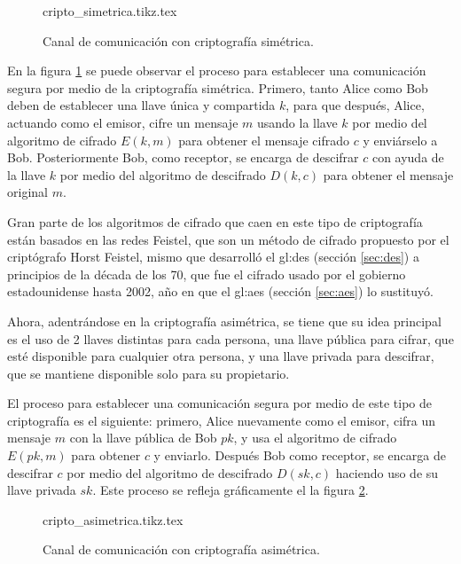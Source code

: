 \begin{figure}
  \begin{center}
    {cripto_simetrica.tikz.tex}
    \caption{Canal de comunicación con criptografía simétrica.}
    \label{cripto_simetrica}
  \end{center}
\end{figure}

En la figura \ref{cripto_simetrica} se puede observar el proceso para
establecer una comunicación segura por medio de la criptografía simétrica.
Primero, tanto Alice como Bob deben de establecer una llave única y
compartida $k$, para que después, Alice, actuando como el emisor, cifre un
mensaje $m$ usando la llave $k$ por medio del algoritmo de cifrado $E(k,m)$
para obtener el mensaje cifrado $c$ y enviárselo a Bob. Posteriormente
Bob, como receptor, se encarga de descifrar $c$ con ayuda de la llave $k$
por medio del algoritmo de descifrado $D(k,c)$ para obtener el mensaje original
$m$.

Gran parte de los algoritmos de cifrado que caen en este tipo de criptografía
están basados en las redes Feistel, que son un método de cifrado propuesto
por el criptógrafo Horst Feistel, mismo que desarrolló el \gls{gl:des}
(sección \ref{sec:des}) a principios de la década de los 70, que fue el
cifrado usado por el gobierno estadounidense hasta 2002, año en que el
\gls{gl:aes} (sección \ref{sec:aes}) lo sustituyó.

Ahora, adentrándose en la criptografía asimétrica, se tiene que su idea
principal es el uso de 2 llaves distintas para cada persona, una llave
pública para cifrar, que esté disponible para cualquier otra persona, y una
llave privada para descifrar, que se mantiene disponible solo para su
propietario.

El proceso para establecer una comunicación segura por medio de este tipo
de criptografía es el siguiente: primero, Alice nuevamente como el emisor,
cifra un mensaje $m$ con la llave pública de Bob $pk$, y usa el algoritmo de
cifrado $E(pk,m)$ para obtener $c$ y enviarlo. Después Bob como receptor,
se encarga de descifrar $c$ por medio del algoritmo de descifrado
$D(sk,c)$ haciendo uso de su llave privada $sk$. Este proceso se refleja
gráficamente el la figura \ref{cripto_asimetrica}.

\begin{figure}
  \begin{center}
    {cripto_asimetrica.tikz.tex}
    \caption{Canal de comunicación con criptografía asimétrica.}
    \label{cripto_asimetrica}
  \end{center}
\end{figure}

